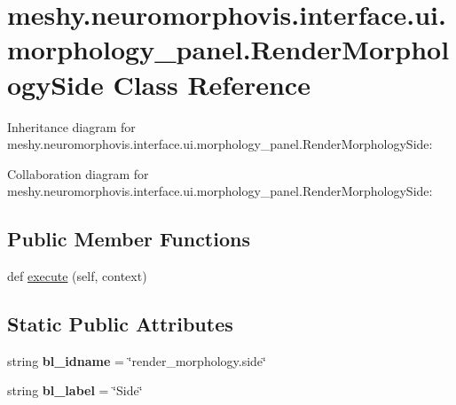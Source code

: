 \hypertarget{classmeshy_1_1neuromorphovis_1_1interface_1_1ui_1_1morphology__panel_1_1RenderMorphologySide}{}\section{meshy.\+neuromorphovis.\+interface.\+ui.\+morphology\+\_\+panel.\+Render\+Morphology\+Side Class Reference}
\label{classmeshy_1_1neuromorphovis_1_1interface_1_1ui_1_1morphology__panel_1_1RenderMorphologySide}


Inheritance diagram for meshy.\+neuromorphovis.\+interface.\+ui.\+morphology\+\_\+panel.\+Render\+Morphology\+Side\+:


Collaboration diagram for meshy.\+neuromorphovis.\+interface.\+ui.\+morphology\+\_\+panel.\+Render\+Morphology\+Side\+:
\subsection*{Public Member Functions}
\begin{DoxyCompactItemize}
\item 
def \hyperlink{classmeshy_1_1neuromorphovis_1_1interface_1_1ui_1_1morphology__panel_1_1RenderMorphologySide_aa5bf7a026f59464490d8513c7818319d}{execute} (self, context)
\end{DoxyCompactItemize}
\subsection*{Static Public Attributes}
\begin{DoxyCompactItemize}
\item 
string {\bfseries bl\+\_\+idname} = \char`\"{}render\+\_\+morphology.\+side\char`\"{}\hypertarget{classmeshy_1_1neuromorphovis_1_1interface_1_1ui_1_1morphology__panel_1_1RenderMorphologySide_aef5ecc34792ab57eb548825372259abd}{}\label{classmeshy_1_1neuromorphovis_1_1interface_1_1ui_1_1morphology__panel_1_1RenderMorphologySide_aef5ecc34792ab57eb548825372259abd}

\item 
string {\bfseries bl\+\_\+label} = \char`\"{}Side\char`\"{}\hypertarget{classmeshy_1_1neuromorphovis_1_1interface_1_1ui_1_1morphology__panel_1_1RenderMorphologySide_a595365da91bf2e70450f06a21db0db2f}{}\label{classmeshy_1_1neuromorphovis_1_1interface_1_1ui_1_1morphology__panel_1_1RenderMorphologySide_a595365da91bf2e70450f06a21db0db2f}

\end{DoxyCompactItemize}



